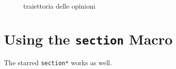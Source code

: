 \documentclass[11pt,largemargins]{homework}
\begin{document}
\begin{alphaparts}
\begin{figure}[htb]
    \caption{traiettoria delle opinioni}
  \end{figure}
\end{alphaparts}
  
    

\section*{Using the \texttt{section} Macro}
  The starred \texttt{section*} works as well.

  \lipsum[11]

  
\renewcommand{\questiontype}{Task}
\end{document}
